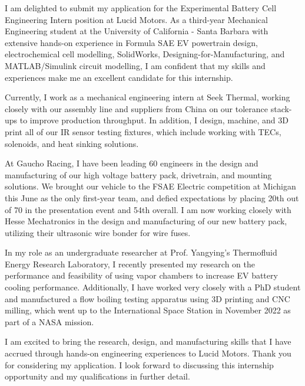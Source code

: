 \documentclass[11pt, letterpaper]{awesome-cv} %
\begin{document}
\makecvheader %

\makelettertitle %


\begin{cvletter}


I am delighted to submit my application for the Experimental Battery Cell Engineering Intern position at Lucid Motors. As a third-year Mechanical Engineering student at the University of California - Santa Barbara with extensive hands-on experience in Formula SAE EV powertrain design, electrochemical cell modelling, SolidWorks, Designing-for-Manufacturing, and MATLAB/Simulink circuit modelling, I am confident that my skills and experiences make me an excellent candidate for this internship.

Currently, I work as a mechanical engineering intern at Seek Thermal, working closely with our assembly line and suppliers from China on our tolerance stack-ups to improve production throughput. In addition, I design, machine, and 3D print all of our IR sensor testing fixtures, which include working with TECs, solenoids, and heat sinking solutions.

At Gaucho Racing, I have been leading 60 engineers in the design and manufacturing of our high voltage battery pack, drivetrain, and mounting solutions. We brought our vehicle to the FSAE Electric competition at Michigan this June as the only first-year team, and defied expectations by placing 20th out of 70 in the presentation event and 54th overall. I am now working closely with Hesse Mechatronics in the design and manufacturing of our new battery pack, utilizing their ultrasonic wire bonder for wire fuses. 

In my role as an undergraduate researcher at Prof. Yangying's Thermofluid Energy Research Laboratory, I recently presented my research on the performance and feasibility of using vapor chambers to increase EV battery cooling performance. Additionally, I have worked very closely with a PhD student and manufactured a flow boiling testing apparatus using 3D printing and CNC milling, which went up to the International Space Station in November 2022 as part of a NASA mission. 

I am excited to bring the research, design, and manufacturing skills that I have accrued through hands-on engineering experiences to Lucid Motors. Thank you for considering my application. I look forward to discussing this internship opportunity and my qualifications in further detail.


\end{cvletter}


\makeletterclosing %
\end{document}
